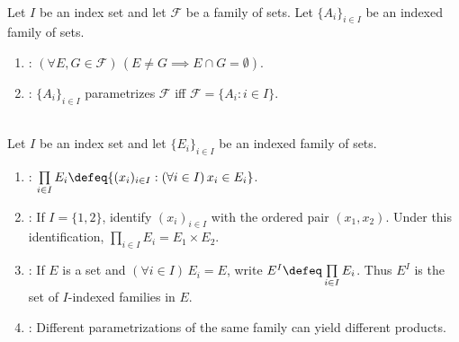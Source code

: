 \begin{definition} \label{def:disjoint-families-and-parametrizations} \\
Let $I$ be an index set and let $\mathcal{F}$ be a family of sets.
Let $\{A_i\}_{i\in I}$ be an indexed family of sets.
\begin{enumerate}[label=(\roman*)]
\setlength{\itemsep}{0pt}
\item {}: $(\forall E,G\in\mathcal{F})\,(E\neq G\implies E\cap G=\emptyset)$.
\item {}: $\{A_i\}_{i\in I}$ parametrizes $\mathcal{F}$ iff $\mathcal{F}=\{A_i:i\in I\}$.
\end{enumerate}
\end{definition}

\begin{definition} \label{def:indexed-cartesian-product} \\
Let $I$ be an index set and let $\{E_i\}_{i\in I}$ be an indexed family of sets.
\begin{enumerate}[label=(\roman*)]
\setlength{\itemsep}{0pt}
\item {}: $\prod\limits_{i\in I}E_i\defeq\{(x_i)_{i\in I}:(\forall i\in I)\,x_i\in E_i\}$.
\item {}: If $I=\{1,2\}$, identify $(x_i)_{i\in I}$ with the ordered pair $(x_1,x_2)$.
Under this identification, $\prod\limits_{i\in I}E_i=E_1\times E_2$.
\item {}: If $E$ is a set and $(\forall i\in I)\,E_i=E$, write $E^I\defeq\prod\limits_{i\in I}E_i$.
Thus $E^I$ is the set of $I$-indexed families in $E$.
\item {}: Different parametrizations of the same family can yield different products.
\end{enumerate}
\end{definition}
